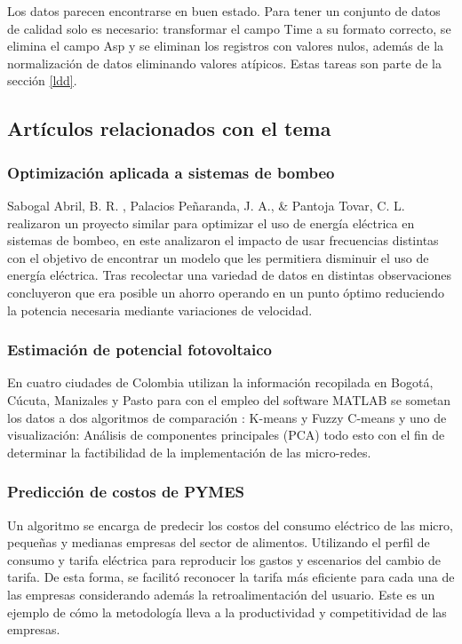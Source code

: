 \documentclass{article}
\begin{document}
Los datos parecen encontrarse en buen estado. Para tener un conjunto de datos de calidad solo es necesario: transformar el campo Time a su formato correcto, se elimina el campo Asp y se eliminan los registros con valores nulos, además de la normalización de datos eliminando valores atípicos. Estas tareas son parte de la sección \ref{ldd}.



\subsection{Artículos relacionados con el tema}

\subsubsection{Optimización aplicada a sistemas de bombeo}

Sabogal Abril, B. R. , Palacios Peñaranda, J. A., \& Pantoja Tovar, C. L. realizaron un proyecto similar para optimizar el uso de energía eléctrica en sistemas de bombeo, en este analizaron el impacto de usar frecuencias distintas con el objetivo de encontrar un modelo que les permitiera disminuir el uso de energía eléctrica. Tras recolectar una variedad de datos en distintas observaciones concluyeron que era posible un ahorro operando en un punto óptimo reduciendo la potencia necesaria mediante variaciones de velocidad. \cite{oesb}

\subsubsection{Estimación de potencial fotovoltaico }
En cuatro ciudades de Colombia utilizan la información recopilada en Bogotá, Cúcuta, Manizales y Pasto para con el empleo del software MATLAB se sometan los datos a dos algoritmos de comparación : K-means y Fuzzy C-means y uno de visualización: Análisis de componentes principales (PCA) todo esto con el fin de determinar la factibilidad de la implementación de las micro-redes. \cite{torres2019estimacion}


\subsubsection{Predicción de costos de PYMES}
Un algoritmo se encarga de predecir los costos del consumo eléctrico de las micro, pequeñas y medianas empresas del sector de alimentos. Utilizando el perfil de consumo y tarifa eléctrica para reproducir los gastos y escenarios del cambio de tarifa. De esta forma, se facilitó reconocer la tarifa más eficiente para cada una de las empresas considerando además la retroalimentación del usuario. Este es un ejemplo de cómo la metodología lleva a la productividad y competitividad de las empresas.\cite{cuisano2020eficiencia}
\end{document}
